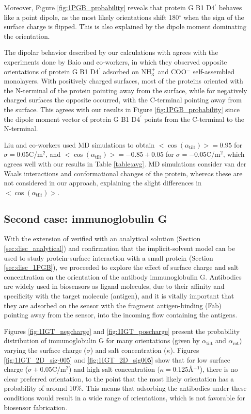 Moreover, Figure \ref{fig:1PGB_probability} reveals that protein G B1 D4$^\prime$ behaves like a point dipole, as the most likely orientations shift 180$^\circ$ when the sign of the surface charge is flipped. This is also explained by the dipole moment dominating the orientation.

The dipolar behavior described by our calculations with \pygbe agrees with the experiments done by Baio and co-workers, \cite{BaioWeidnerBaughGambleStaytonCastner2012} in which they observed opposite orientations of protein G B1 D4$^\prime$ adsorbed on NH$_3^+$ and COO$^-$ self-assembled monolayers. With positively charged surfaces, most of the proteins oriented with the N-terminal of the protein pointing away from the surface, while for negatively charged surfaces the opposite occurred, with the C-terminal pointing away from the surface. This agrees with our results in Figure \ref{fig:1PGB_probability} since the dipole moment vector of protein G B1 D4$^\prime$ points from the C-terminal to the N-terminal.

Liu and co-workers \cite{LiuLiaoZhou2013} used MD simulations to obtain $<\cos(\alpha_{\text{tilt}})>=0.95$ for $\sigma = 0.05$C/m$^2$, and $<\cos(\alpha_{\text{tilt}})>=-0.85\pm0.05$ for $\sigma = -0.05$C/m$^2$, which agrees well with our results in Table \ref{table:avg}. MD simulations consider van der Waals interactions and conformational changes of the protein, whereas these are not considered in our approach, explaining the slight differences in $<\cos(\alpha_{\text{tilt}})>$.

 \subsection{Second case: immunoglobulin G}
 
 With the extension of \pygbe verified with an analytical solution (Section \ref{sec:disc_analytical}) and confirmation that the implicit-solvent model can be used to study protein-surface interaction with a small protein (Section \ref{sec:disc_1PGB}), we proceeded to explore the effect of surface charge and salt concentration on the orientation of the antibody immunoglobulin G. Antibodies are widely used in biosensors as ligand molecules, due to their affinity and specificity with the target molecule (antigen), and it is vitally important that they are adsorbed on the sensor with the fragment antigen-binding (Fab) pointing away from the sensor, into the incoming flow containing the antigens.
 
 Figures \ref{fig:1IGT_negcharge} and \ref{fig:1IGT_poscharge} present the probability distribution of immunoglobulin G for many orientations (given by $\alpha_\text{tilt}$ and $\alpha_\text{rot}$) varying the surface charge ($\sigma$) and salt concentration ($\kappa$). Figures \ref{fig:1IGT_2D_sig-005} and \ref{fig:1IGT_2D_sig005} show that for low surface charge ($\sigma \pm 0.05$C/m$^2$) and high salt concentration ($\kappa=0.125$\AA$^{-1}$), there is no clear preferred orientation, to the point that the most likely orientation has a probability of around 10\%. This means that adsorbing the antibodies under these conditions would result in a wide range of orientations, which is not favorable for biosensor fabrication.
 
